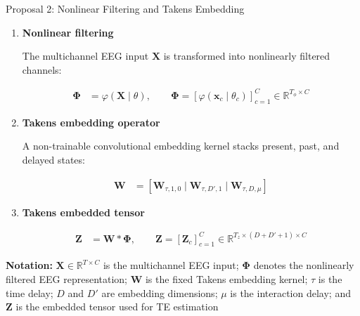 \documentclass[aspectratio=169]{beamer}
\let\oldcite\cite
\renewcommand{\cite}[1]{{\tiny\oldcite{#1}}}
\begin{document}
\begin{frame}{Proposal 2: Nonlinear Filtering and Takens Embedding}
\scriptsize
\setlength{\abovedisplayskip}{2pt}
\setlength{\belowdisplayskip}{2pt}
\setlength{\jot}{2pt}

\begin{enumerate}
\setlength{\itemsep}{0.08cm}

\item \textbf{Nonlinear filtering}
{\scriptsize \cite{schirrmeister2017deep}}

The multichannel EEG input $\mathbf{X}$ is transformed into nonlinearly filtered channels:

\begin{align*}
\boldsymbol{\Phi}
&=
\varphi(\mathbf{X}\mid \theta),
\qquad
\boldsymbol{\Phi}
=
\left[
\varphi(\mathbf{x}_c\mid \theta_c)
\right]_{c=1}^{C}
\in
\mathbb{R}^{T_{\phi}\times C}
\end{align*}

\item \textbf{Takens embedding operator}
{\scriptsize \cite{takens1981detecting}}

A non-trainable convolutional embedding kernel stacks present, past, and delayed states:

\begin{align*}
\mathbf{W}
&=
\left[
\mathbf{W}_{\tau,1,0}
\mid
\mathbf{W}_{\tau,D',1}
\mid
\mathbf{W}_{\tau,D,\mu}
\right]
\end{align*}

\item \textbf{Takens embedded tensor}

\begin{align*}
\mathbf{Z}
&=
\mathbf{W}*\boldsymbol{\Phi},
\qquad
\mathbf{Z}
=
\left[
\mathbf{Z}_c
\right]_{c=1}^{C}
\in
\mathbb{R}^{T_z\times(D+D'+1)\times C}
\end{align*}
\vspace{-0.35cm}

\end{enumerate}

\vspace{0.04cm}

{\scriptsize
\textbf{Notation:}
$\mathbf{X}\in\mathbb{R}^{T\times C}$ is the multichannel EEG input;
$\boldsymbol{\Phi}$ denotes the nonlinearly filtered EEG representation;
$\mathbf{W}$ is the fixed Takens embedding kernel;
$\tau$ is the time delay;
$D$ and $D'$ are embedding dimensions;
$\mu$ is the interaction delay;
and $\mathbf{Z}$ is the embedded tensor used for TE estimation
}

 \end{frame}
\end{document}
